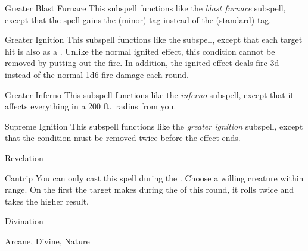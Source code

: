 \begin{ability}[\nth{4}]{Greater Blast Furnace}
This subspell functions like the \textit{blast furnace} subspell, except that the spell gains the  (minor) tag instead of the  (standard) tag.
\end{ability}
\vspace{0.25em}


\begin{ability}[\nth{4}]{Greater Ignition}
This subspell functions like the  subspell, except that each target hit is also  as a .
Unlike the normal ignited effect, this condition cannot be removed by putting out the fire.
In addition, the ignited effect deals fire  \minus3d instead of the normal 1d6 fire damage each round.
\end{ability}
\vspace{0.25em}


\begin{ability}[\nth{5}]{Greater Inferno}
This subspell functions like the \textit{inferno} subspell, except that it affects everything in a 200 ft.\ radius from you.
\end{ability}
\vspace{0.25em}


\begin{ability}[\nth{6}]{Supreme Ignition}
This subspell functions like the \textit{greater ignition} subspell, except that the condition must be removed twice before the effect ends.
\end{ability}
\vspace{0.25em}

\newpage
\begin{spellsection}{Revelation}

\begin{spellheader}
\end{spellheader}


\begin{ability}{Cantrip}
You can only cast this spell during the .
Choose a willing creature within \rngclose range.
On the first  the target makes during the  of this round, it rolls twice and takes the higher result.
\end{ability}




 Divination

 Arcane, Divine, Nature
\end{spellsection}


